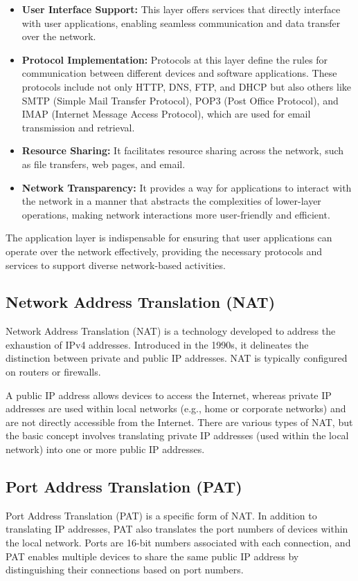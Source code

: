 \begin{itemize}
    \item \textbf{User Interface Support:} This layer offers services that directly interface with user applications, enabling seamless communication and data transfer over the network.

    \item \textbf{Protocol Implementation:} Protocols at this layer define the rules for communication between different devices and software applications. These protocols include not only HTTP, DNS, FTP, and DHCP but also others like SMTP (Simple Mail Transfer Protocol), POP3 (Post Office Protocol), and IMAP (Internet Message Access Protocol), which are used for email transmission and retrieval.

    \item \textbf{Resource Sharing:} It facilitates resource sharing across the network, such as file transfers, web pages, and email.

    \item \textbf{Network Transparency:} It provides a way for applications to interact with the network in a manner that abstracts the complexities of lower-layer operations, making network interactions more user-friendly and efficient.
\end{itemize}

The application layer is indispensable for ensuring that user applications can operate over the network effectively, providing the necessary protocols and services to support diverse network-based activities.


\subsection{Network Address Translation (NAT)}
Network Address Translation (NAT) is a technology developed to address the exhaustion of IPv4 addresses. Introduced in the 1990s, it delineates the distinction between private and public IP addresses. NAT is typically configured on routers or firewalls.

A public IP address allows devices to access the Internet, whereas private IP addresses are used within local networks (e.g., home or corporate networks) and are not directly accessible from the Internet. There are various types of NAT, but the basic concept involves translating private IP addresses (used within the local network) into one or more public IP addresses.

\subsection{Port Address Translation (PAT)}
Port Address Translation (PAT) is a specific form of NAT. In addition to translating IP addresses, PAT also translates the port numbers of devices within the local network. Ports are 16-bit numbers associated with each connection, and PAT enables multiple devices to share the same public IP address by distinguishing their connections based on port numbers.

